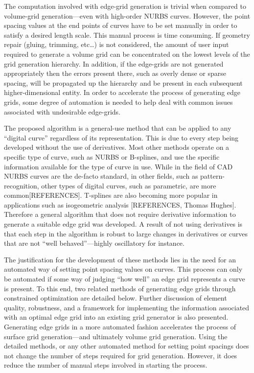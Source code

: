 The computation involved with edge-grid generation is trivial when compared to volume-grid generation—even with high-order NURBS curves. However, the point spacing values at the end points of curves have to be set manually in order to satisfy a desired length scale. This manual process is time consuming. If geometry repair (gluing, trimming, etc…) is not considered, the amount of user input required to generate a volume grid can be concentrated on the lowest levels of the grid generation hierarchy. In addition, if the edge-grids are not generated appropriately then the errors present there, such as overly dense or sparse spacing, will be propagated up the hierarchy and be present in each subsequent higher-dimensional entity. In order to accelerate the process of generating edge grids, some degree of automation is needed to help deal with common issues associated with undesirable edge-grids.

The proposed algorithm is a general-use method that can be applied to any ``digital curve'' regardless of its representation. This is due to every step being developed without the use of derivatives. Most other methods operate on a specific type of curve, such as NURBS or B-splines, and use the specific information available for the type of curve in use. While in the field of CAD NURBS curves are the de-facto standard, in other fields, such as pattern-recognition, other types of digital curves, such as parametric, are more common[REFERENCES]. T-splines are also becoming more popular in applications such as isogeometric analysis [REFERENCES, Thomas Hughes]. Therefore a general algorithm that does not require derivative information to generate a suitable edge grid was developed. A result of not using derivatives is that each step in the algorithm is robust to large changes in derivatives or curves that are not ``well behaved''---highly oscillatory for instance.

The justification for the development of these methods lies in the need for an automated way of setting point spacing values on curves. This process can only be automated if some way of judging ``how well'' an edge grid represents a curve is present. To this end, two related methods of generating edge grids through constrained optimization are detailed below. Further discussion of element quality, robustness, and a framework for implementing the information associated with an optimal edge grid into an existing grid generator is also presented. Generating edge grids in a more automated fashion accelerates the process of surface grid generation---and ultimately volume grid generation. Using the detailed methods, or any other automated method for setting point spacings does not change the number of steps required for grid generation. However, it does reduce the number of manual steps involved in starting the process.

